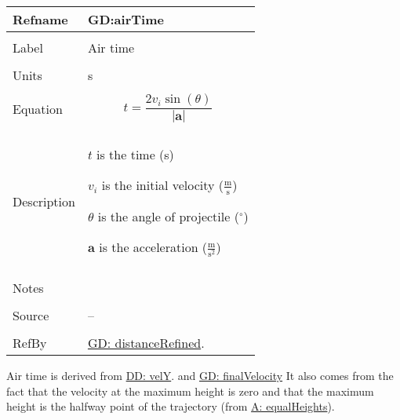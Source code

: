 \documentclass[12pt]{article}
\begin{document}
\noindent \begin{minipage}{\textwidth}
\begin{tabular}{p{} p{}}
\toprule \textbf{Refname} & \textbf{GD:airTime}
\label{GD:airTime}
\\ \midrule \\
Label & Air time
\\ \midrule \\
Units & s
\\ \midrule \\
Equation & \begin{displaymath}
           t=\frac{2 {v_{i}} \sin\left(θ\right)}{|\mathbf{a}|}
           \end{displaymath}
\\ \midrule \\
Description & \begin{symbDescription}
              \item{$t$ is the time (s)}
              \item{${v_{i}}$ is the initial velocity ($\frac{\text{m}}{\text{s}}$)}
              \item{$θ$ is the angle of projectile (${}^{\circ}$)}
              \item{$\mathbf{a}$ is the acceleration ($\frac{\text{m}}{\text{s}^{2}}$)}
              \end{symbDescription}
\\ \midrule \\
Notes & 
\\ \midrule \\
Source & --
\\ \midrule \\
RefBy & \hyperref[GD:distanceRefined]{GD: distanceRefined}.
\\ \bottomrule \end{tabular}
\end{minipage}
Air time is derived from \hyperref[DD:velY]{DD: velY}. and \hyperref[GD:finalVelocity]{GD: finalVelocity} It also comes from the fact that the velocity at the maximum height is zero and that the maximum height is the halfway point of the trajectory (from \hyperref[equalHeights]{A: equalHeights}).
\par~
\end{document}

